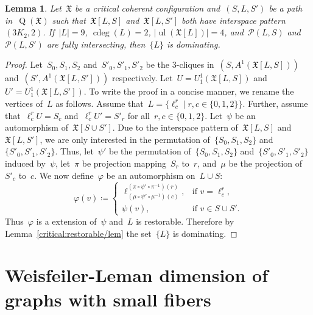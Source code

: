 \documentclass[english,a4paper]{article}
\theoremstyle{plain}
\newtheorem{lemma}      [theorem]{Lemma}
\theoremstyle{definition}
\newcommand{\reverseFunction}[1]{\ensuremath{#1^{-1}}}
\newcommand{\coherentConfig}{\ensuremath{\mathfrak{X}}}
\newcommand{\interspace}[2]{\ensuremath{\coherentConfig[#1,#2]}}
\newcommand{\inducedCC}[1]{\ensuremath{\coherentConfig[#1]}}
\DeclareMathOperator*{\ul}{ul}
\newcommand{\arcs}{\ensuremath{A}}
\DeclareMathOperator*{\Quotient}{Q}
\newcommand{\quotientGraph}[1]{\ensuremath{\Quotient(#1)}}
\DeclareMathOperator{\ColorDeg}{cdeg}
\newcommand{\colorDeg}[1]{\ensuremath{\ColorDeg\left(#1\right)}}
\newcommand{\equivalenceClasses}[1]{\ensuremath{\mathcal{P}(#1)}}
\newcommand{\ipsixMatching}             {\ensuremath{(\disjointCliques{3}{2},2)}}
\newcommand{\clique}[1]{\ensuremath{K_{#1}}}
\newcommand{\disjointCliques}[2]{\ensuremath{#1 \clique{#2}}}
\begin{document}
\begin{lemma}
\label{restorable:two-3K2,2-ip:fully-intersecting/lem}
    Let~$\coherentConfig$ be a critical coherent configuration and~$(S,L,S')$ be a path in~$\quotientGraph{\coherentConfig}$ such that~$\interspace{L}{S}$ and~$\interspace{L}{S'}$ both have interspace pattern~$\ipsixMatching$.
    If~$|L| = 9$, $\colorDeg{L} = 2$, $|\ul(\inducedCC{L})| = 4$, and~$\equivalenceClasses{L,S}$ and~$\equivalenceClasses{L,S'}$ are fully intersecting, then~$\{L\}$ is dominating.
\end{lemma}
\begin{proof}
    Let~$S_0,S_1,S_2$ and~$S'_0,S'_1,S'_2$ be the $3$-cliques in~$(S,\arcs^1(\interspace{L}{S}))$ and~$(S',\arcs^1(\interspace{L}{S'}))$ respectively.
    Let~$U  = U^1_1(\interspace{L}{S})$ and~$U' = U^1_1(\interspace{L}{S'})$.
    To write the proof in a concise manner, we rename the vertices of~$L$ as follows.
    Assume that~$L = \{\ell^r_c \mid r,c \in \{0,1,2\}\}$.
    Further, assume that~$\ell^r_c U = S_c$ and~$\ell^r_c U' = S'_r$ for all~$r,c \in \{0,1,2\}$.
    Let~$\psi$ be an automorphism of~$\inducedCC{S \cup S'}$.
    Due to the interspace pattern of~$\interspace{L}{S}$ and~$\interspace{L}{S'}$, we are only interested in the permutation of~$\{S_0,S_1,S_2\}$ and~$\{S'_0,S'_1,S'_2\}$.
    Thus, let~$\psi'$ be the permutation of~$\{S_0,S_1,S_2\}$ and~$\{S'_0,S'_1,S'_2\}$ induced by~$\psi$, let~$\pi$ be projection mapping~$S_r$ to~$r$, and~$\mu$ be the projection of~$S'_c$ to~$c$.
    We now define~$\varphi$ be an automorphism on~$L \cup S$:
    \[
        \varphi(v) \coloneqq
        \begin{cases}
            \ell^{(\pi \circ \psi' \circ \reverseFunction{\pi})(r)}_{(\mu \circ \psi' \circ \reverseFunction{\mu})(c)}, &\text{if } v = \ell^r_c, \\
            \psi(v),                                                                                                    &\text{if } v \in S \cup S'.
        \end{cases}
    \]
    Thus~$\varphi$ is a extension of~$\psi$ and~$L$ is restorable.
    Therefore by Lemma~\ref{critical:restorable/lem} the set~$\{L\}$ is dominating.
\end{proof}




 


\section{Weisfeiler-Leman dimension of graphs with small fibers}
\label{wldim-small/sec}
\end{document}

